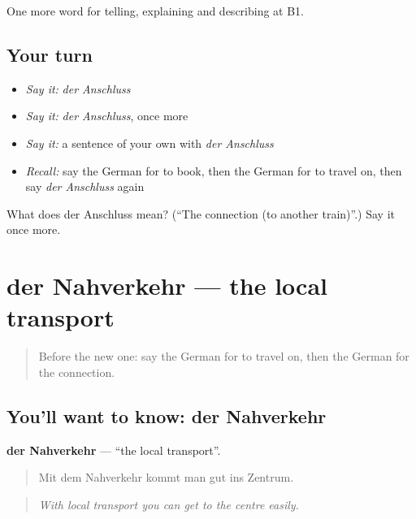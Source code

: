 \begin{grammarlens}[title={What you've built}]
One more word for telling, explaining and describing at B1.
\end{grammarlens}

\subsection*{Your turn}
\begin{itemize}
\raggedright
  \item \emph{Say it:} \emph{der Anschluss}
  \item \emph{Say it:} \emph{der Anschluss}, once more
  \item \emph{Say it:} a sentence of your own with \emph{der Anschluss}
  \item \emph{Recall:} say the German for to book, then the German for to travel on, then say \emph{der Anschluss} again
\end{itemize}

\begin{tcolorbox}[breakable,colback=teal!4,colframe=teal!35!black,title={Before you move on}]
What does der Anschluss mean? (\textquotedblleft{}The connection (to another train)\textquotedblright{}.) Say it once more.
\end{tcolorbox}
\section[der Nahverkehr]{der Nahverkehr — the local transport}

\label{lesson:GE-C414-nahverkehr}



\begin{quote}
Before the new one: say the German for to travel on, then the German for the connection.
\end{quote}

\subsection*{You'll want to know: der Nahverkehr}
\textbf{der Nahverkehr} — \textquotedblleft{}the local transport\textquotedblright{}.

\begin{quote}
Mit dem Nahverkehr kommt man gut ins Zentrum.
\end{quote}

\begin{quote}
\emph{With local transport you can get to the centre easily.}
\end{quote}

